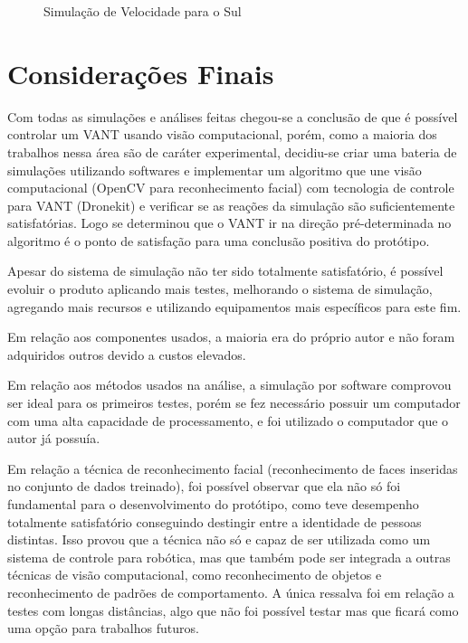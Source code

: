 \begin{figure}[H]
	\centering	
	\caption{Simulação de Velocidade para o Sul}
	\def\svgwidth{15cm}
	
	\label{fig:vel4}
\end{figure}

\section{Considerações Finais}

Com todas as simulações e análises feitas chegou-se a conclusão de que é possível controlar um VANT usando visão computacional, porém, como a maioria dos trabalhos nessa área são de caráter experimental,  decidiu-se criar uma bateria de simulações utilizando softwares e implementar um algoritmo que une visão computacional (OpenCV para reconhecimento facial) com tecnologia de controle para VANT (Dronekit) e verificar se as reações da simulação são suficientemente satisfatórias. Logo se determinou que o VANT ir na direção pré-determinada no algoritmo é o ponto de satisfação para uma conclusão positiva do protótipo.

Apesar do sistema de simulação não ter sido totalmente satisfatório, é possível evoluir o produto aplicando mais testes, melhorando o sistema de simulação, agregando mais recursos e utilizando equipamentos mais específicos para este fim.

Em relação aos componentes usados, a maioria era do próprio autor e não foram adquiridos outros devido a custos elevados.  

Em relação aos métodos usados na análise, a simulação por software comprovou ser ideal para os primeiros testes, porém se fez necessário possuir um computador com uma alta capacidade de processamento, e foi utilizado o computador que o autor já possuía. 

Em relação a técnica de reconhecimento facial (reconhecimento de faces inseridas no conjunto de dados treinado), foi possível observar que ela não só foi fundamental para o desenvolvimento do protótipo, como teve desempenho totalmente satisfatório conseguindo destingir entre a identidade de pessoas distintas. Isso provou que a técnica não só e capaz de ser utilizada como um sistema de controle para robótica, mas que também pode ser integrada a outras técnicas de visão computacional, como 
reconhecimento de objetos e reconhecimento de padrões de comportamento. A única ressalva foi em relação a testes com longas distâncias, algo que não foi possível testar mas que ficará como uma opção para trabalhos futuros. 

